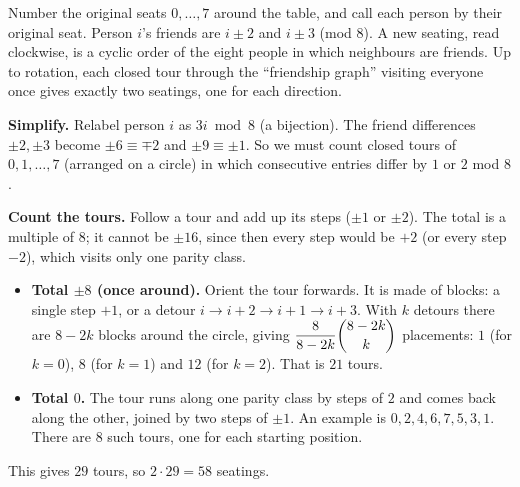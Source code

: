 Number the original seats $0,\dots,7$ around the table, and call each person by their original seat. Person $i$'s friends are $i\pm2$ and $i\pm3$ (mod $8$). A new seating, read clockwise, is a cyclic order of the eight people in which neighbours are friends. Up to rotation, each closed tour through the ``friendship graph'' visiting everyone once gives exactly two seatings, one for each direction.

\textbf{Simplify.} Relabel person $i$ as $3i\bmod8$ (a bijection). The friend differences $\pm2,\pm3$ become $\pm6\equiv\mp2$ and $\pm9\equiv\pm1$. So we must count closed tours of $0,1,\dots,7$ (arranged on a circle) in which consecutive entries differ by $1$ or $2$ mod $8$.

\textbf{Count the tours.} Follow a tour and add up its steps ($\pm1$ or $\pm2$). The total is a multiple of $8$; it cannot be $\pm16$, since then every step would be $+2$ (or every step $-2$), which visits only one parity class.
\begin{itemize}
\item \textbf{Total $\pm8$ (once around).} Orient the tour forwards. It is made of blocks: a single step $+1$, or a detour $i\to i+2\to i+1\to i+3$. With $k$ detours there are $8-2k$ blocks around the circle, giving $\dfrac{8}{8-2k}\dbinom{8-2k}k$ placements: $1$ (for $k=0$), $8$ (for $k=1$) and $12$ (for $k=2$). That is $21$ tours.
\item \textbf{Total $0$.} The tour runs along one parity class by steps of $2$ and comes back along the other, joined by two steps of $\pm1$. An example is $0,2,4,6,7,5,3,1$. There are $8$ such tours, one for each starting position.
\end{itemize}
This gives $29$ tours, so $2\cdot29=\boxed{58}$ seatings.

